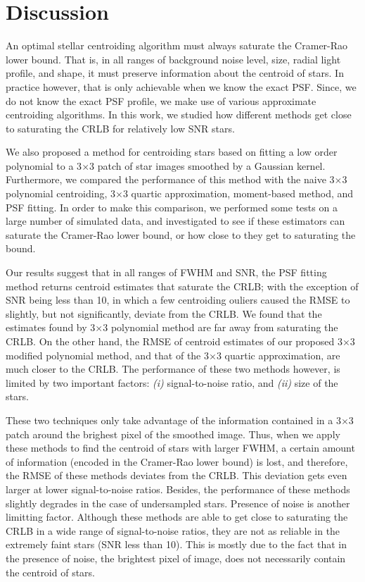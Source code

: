 \documentclass[12pt, preprint]{aastex}
\begin{document}
\section{Discussion}\label{sec:discussion}

An optimal stellar centroiding algorithm must always saturate the Cramer-Rao lower 
bound. That is, in all ranges of background noise level, size, radial light profile,
and shape, it must preserve information about the centroid of stars. In practice however,
that is only achievable when we know the exact PSF. Since, we do not know the exact PSF
profile, we make use of various approximate centroiding algorithms. In this work, we
studied how different methods get close to saturating the CRLB for relatively low SNR
stars.
 
We also proposed a method for centroiding stars based on fitting a low order
polynomial to a 3$\times$3 patch of star images smoothed by a Gaussian kernel. 
Furthermore, we compared the performance of this method with the naive 3$\times$3 polynomial
centroiding, 3$\times$3 quartic approximation, moment-based method, and PSF fitting.
In order to make this comparison, we performed some tests on a large number of
simulated data, and investigated to see if these estimators can saturate the Cramer-Rao
lower bound, or how close to they get to saturating the bound. 

Our results suggest that in all ranges of FWHM and SNR, the PSF fitting method returns 
centroid estimates that saturate the CRLB; with the exception of SNR being less than 10, 
in which a few centroiding ouliers caused the RMSE to slightly, but not significantly, deviate
from the CRLB. We found that the estimates found by 3$\times$3 polynomial method are far away from
saturating the CRLB. On the other hand, the RMSE of centroid estimates of our proposed
3$\times$3 modified polynomial method, and that of the 3$\times$3 quartic approximation,
are much closer to the CRLB. The performance of these two methods however, is limited by
two important factors: \emph{(i)} signal-to-noise ratio, and \emph{(ii)} size of the stars.

These two techniques only take advantage of the information contained in a 3$\times$3
patch around the brighest pixel of the smoothed image. Thus, when we apply 
these methods to find the centroid of stars with larger FWHM, a certain amount of
information (encoded in the Cramer-Rao lower bound) is lost, and therefore, the RMSE
of these methods deviates from the CRLB. This deviation gets even larger at lower
signal-to-noise ratios. Besides, the performance of these methods slightly degrades
in the case of undersampled stars. Presence of noise is another limitting factor.
Although these methods are able to get close to saturating the CRLB in a wide range of
signal-to-noise ratios, they are not as reliable in the extremely faint stars
(SNR less than 10). This is mostly due to the fact that in the presence of noise, 
the brightest pixel of image, does not necessarily contain the centroid of stars. 
\end{document}
